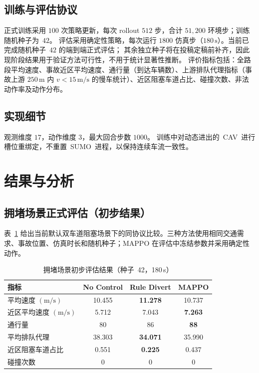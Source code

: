 \documentclass[UTF8,a4paper,11pt]{ctexart}
\begin{document}
\subsection{训练与评估协议}
正式训练采用 $100$ 次策略更新，每次 rollout $512$ 步，合计 $51{,}200$ 环境步；训练随机种子为~$42$。
评估采用确定性策略，每次运行 $1800$ 仿真步（$180\,\mathrm{s}$）。当前已完成随机种子~$42$ 的端到端正式评估；
其余独立种子将在投稿定稿前补齐，因此现阶段结果用于验证方法可行性，不用于统计显著性推断。
评价指标包括：全路段平均速度、事故近区平均速度、通行量（到达车辆数）、上游排队代理指标（事故上游 $250\,\mathrm{m}$ 内 $v<15\,\mathrm{m/s}$ 的慢车统计）、近区阻塞车道占比、碰撞次数、非法动作率及动作分布。

\subsection{实现细节}
观测维度 $17$，动作维度 $3$，最大回合步数 $1000$。
训练中对动态进出的~CAV~进行槽位重绑定，不重置~SUMO~进程，以保持连续车流一致性。

\section{结果与分析}
\label{sec:results}

\subsection{拥堵场景正式评估（初步结果）}
表~\ref{tab:eval} 给出当前默认双车道阻塞场景下的同协议比较。三种方法使用相同交通需求、事故位置、仿真时长和随机种子；MAPPO 在评估中冻结参数并采用确定性动作。

\begin{table}[htbp]
  \centering
  \caption{拥堵场景初步评估结果（种子~42，180\,s）}
  \label{tab:eval}
  \begin{tabular}{lccc}
    \toprule
    指标 & No Control & Rule Divert & MAPPO \\
    \midrule
    平均速度 $(\mathrm{m/s})$ & 10.455 & \textbf{11.278} & 10.737 \\ 
    近区平均速度 $(\mathrm{m/s})$ & 5.712 & 7.043 & \textbf{7.263} \\ 
    通行量 & 80 & 86 & \textbf{88} \\ 
    平均排队代理 & 38.303 & \textbf{34.071} & 35.990 \\ 
    近区阻塞车道占比 & 0.551 & \textbf{0.225} & 0.437 \\ 
    碰撞次数 & 0 & 0 & 0 \\ 
    \bottomrule
  \end{tabular}
\end{table}
\end{document}
